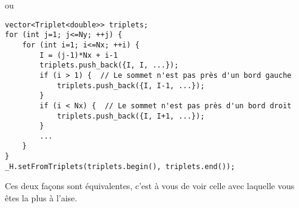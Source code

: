 \documentclass[11pt]{article}
\begin{document}
ou

\begin{Verbatim}
vector<Triplet<double>> triplets;
for (int j=1; j<=Ny; ++j) {
    for (int i=1; i<=Nx; ++i) {
        I = (j-1)*Nx + i-1
        triplets.push_back({I, I, ...});
        if (i > 1) {  // Le sommet n'est pas près d'un bord gauche
            triplets.push_back({I, I-1, ...});
        }
        if (i < Nx) {  // Le sommet n'est pas près d'un bord droit
            triplets.push_back({I, I+1, ...});
        } 
        ...
    }
}
_H.setFromTriplets(triplets.begin(), triplets.end());
\end{Verbatim}

Ces deux façons sont équivalentes, c'est à vous de voir celle avec laquelle vous êtes la plus à l'aise.
\end{document}
